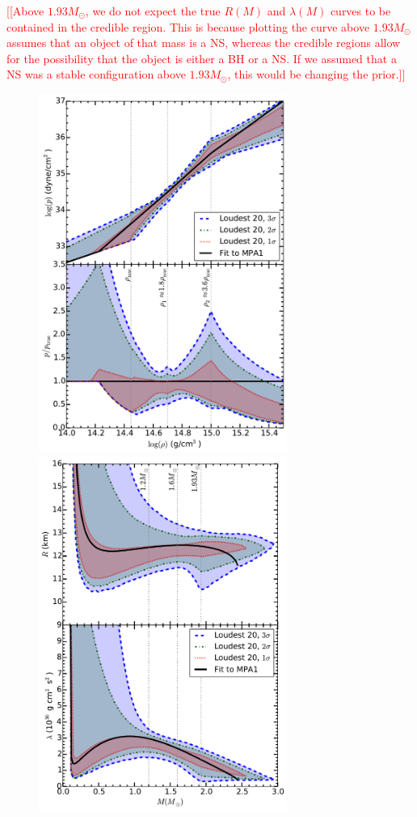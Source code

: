\documentclass[twocolumn,prd,amssymb,aps,nofootinbib,showpacs,epsf]{revtex4}
\newcommand{\red}{\textcolor{red}}
\begin{document}
\red{[[Above $1.93M_\odot$, we do not expect the true $R(M)$ and $\lambda(M)$ curves to be contained in the credible region. This is because plotting the curve above $1.93M_\odot$ assumes that an object of that mass is a NS, whereas the credible regions allow for the possibility that the object is either a BH or a NS. If we assumed that a NS was a stable configuration above $1.93M_\odot$, this would be changing the prior.]]}

\begin{figure}[!htb]
\begin{center}
\includegraphics[width=3.2in]{LALMCMCmpa1FitTaylorF2ZeroNoiseBNS20p.pdf}
\includegraphics[width=3.2in]{LALMCMCmpa1FitTaylorF2ZeroNoiseBNS20Radiuslambda.pdf}

\end{center}
\end{figure}
\end{document}
